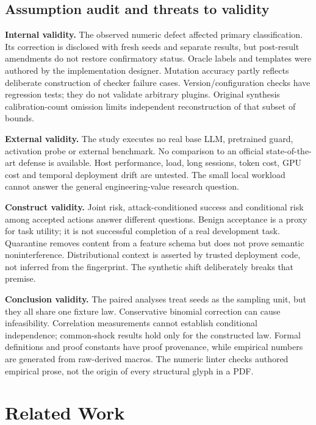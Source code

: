 \documentclass[lettersize,journal]{IEEEtran}
\begin{document}
\subsection{Assumption audit and threats to validity}
\textbf{Internal validity.} The observed numeric defect affected primary
classification. Its correction is disclosed with fresh seeds and separate
results, but post-result amendments do not restore confirmatory status.
Oracle labels and templates were authored by the implementation designer.
Mutation accuracy partly reflects deliberate construction of checker failure
cases. Version/configuration checks have regression tests; they do not validate
arbitrary plugins. Original synthesis calibration-count omission limits
independent reconstruction of that subset of bounds.

\textbf{External validity.} The study executes no real base LLM, pretrained
guard, activation probe or external benchmark. No comparison to an official
state-of-the-art defense is available. Host performance, load, long sessions,
token cost, GPU cost and temporal deployment drift are untested. The small
local workload cannot answer the general engineering-value research question.

\textbf{Construct validity.} Joint risk, attack-conditioned success and
conditional risk among accepted actions answer different questions. Benign
acceptance is a proxy for task utility; it is not successful completion of a
real development task. Quarantine removes content from a feature schema but
does not prove semantic noninterference. Distributional context is asserted
by trusted deployment code, not inferred from the fingerprint. The synthetic
shift deliberately breaks that premise.

\textbf{Conclusion validity.} The paired analyses treat seeds as the sampling
unit, but they all share one fixture law. Conservative binomial correction can
cause infeasibility. Correlation measurements cannot establish conditional
independence; common-shock results hold only for the constructed law. Formal
definitions and proof constants have proof provenance, while empirical numbers
are generated from raw-derived macros. The numeric linter checks authored
empirical prose, not the origin of every structural glyph in a PDF.

\section{Related Work}
\label{sec:related}
\end{document}
